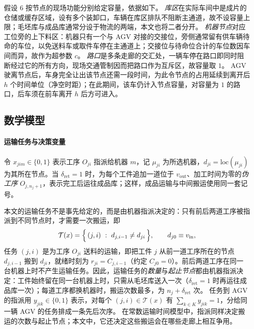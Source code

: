 \documentclass[manuscript,screen,review]{acmart}
\begin{document}
假设 6 按节点的现场功能分别给定容量，依据如下。
\emph{库区}在实际车间中是成片的仓储或缓存区域，设有多个装卸口，车辆在库区排队不阻断主通道，故不设容量上限；毛坯库与成品库通常分设于物流的两端，本文也将二者分开。
\emph{机器节点}对应工位旁的上下料区：机器只有一个与 AGV 对接的交接位，旁侧通常留有供车辆待命的车位，以免送料车或取件车停在主通道上；交接位与待命位合计的车位数因车间而异，故作为超参数 $c$。
\emph{路口}是多条走廊的交汇处，一辆车停在路口即同时阻断经过它的所有方向，现场交通管制因而把路口作为互斥区，故容量取 $1$。
AGV 驶离节点后，车身完全让出该节点还需一段时间，为此令节点的占用延续到离开后 $h$ 个时间单位（净空时距）；在此期间，该车仍计入节点容量，对容量为 $1$ 的路口，后车须在前车离开 $h$ 后方可进入。

\subsection{数学模型}
\label{sec:model}

\paragraph{运输任务与决策变量}
令 $x_{jim}\in\{0,1\}$ 表示工序 $O_{ji}$ 指派给机器 $m$，记 $\mu_{ji}$ 为所选机器，$d_{ji}=\mathrm{loc}(\mu_{ji})$ 为其所在节点。当 $\delta_{\mathrm{ret}}=1$ 时，为每个工件追加一道位于 $v_{\mathrm{out}}$、加工时间为零的\emph{伪工序} $O_{j,n_j+1}$，表示完工后运往成品库；这样，成品运输与中间搬运使用同一套记号。

本文的运输任务不是事先给定的，而是由机器指派决定的：只有前后两道工序被指派到不同节点时，才需要一次搬运，即
\begin{equation}
\label{eq:tasks}
\mathcal{T}(x)=\Bigl\{\,(j,i)\ :\ d_{j,i-1}\neq d_{ji}\,\Bigr\},
\qquad d_{j0}\equiv v_{\mathrm{in}} ,
\end{equation}
任务 $(j,i)$ 是为工序 $O_{ji}$ 送料的运输，即把工件 $j$ 从前一道工序所在的节点 $d_{j,i-1}$ 搬到 $d_{ji}$，就绪时刻为 $r_{ji}=C_{j,i-1}$（约定 $C_{j0}=0$）。前后两道工序在同一台机器上时不产生运输任务。因此，运输任务的\emph{数量}与\emph{起止节点}都由机器指派决定：工件始终留在同一台机器上时，只需从毛坯库送入一次（$\delta_{\mathrm{ret}}=1$ 时再运往成品库一次）；每道工序都换机器时，搬运次数最多，为 $n_j+\delta_{\mathrm{ret}}$ 次。
任务到 AGV 的指派用 $y_{jik}\in\{0,1\}$ 表示，对每个 $(j,i)\in\mathcal{T}(x)$ 有 $\sum_{k\in K}y_{jik}=1$，分给同一辆 AGV 的任务排成一条先后次序。
在常数运输时间模型中，指派同样决定搬运的次数与起止节点；本文中，它还决定这些搬运会在哪些走廊上相互争用。
\end{document}

